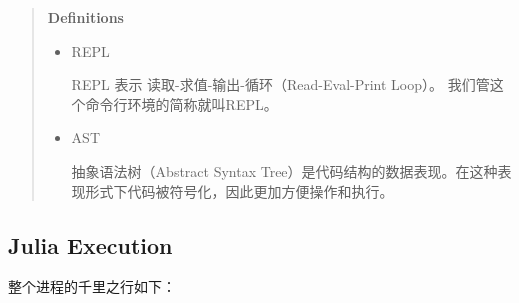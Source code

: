 \begin{quote}
\textbf{Definitions}

\begin{itemize}
\item REPL

REPL 表示 读取-求值-输出-循环（Read-Eval-Print Loop）。 我们管这个命令行环境的简称就叫REPL。


\item AST

抽象语法树（Abstract Syntax Tree）是代码结构的数据表现。在这种表现形式下代码被符号化，因此更加方便操作和执行。

\end{itemize}
\end{quote}


\hypertarget{12349293482799060845}{}


\subsection{Julia Execution}



整个进程的千里之行如下：



